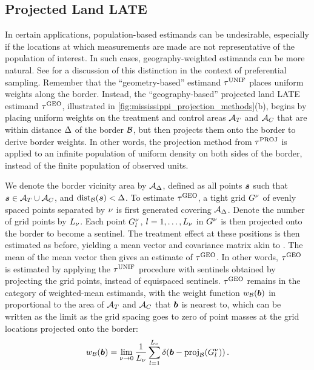 \subsection{Projected Land LATE}
In certain applications, population-based estimands can be undesirable, especially if the locations at which measurements are made are not representative of the population of interest.
In such cases, geography-weighted estimands can be more natural.
See \cite{antonelli2016positive} for a discussion of this distinction in the context of preferential sampling.
Remember that the ``geometry-based'' estimand \(\tau^{\mathrm{UNIF}}\) places uniform weights along the border.
Instead, the ``geography-based'' projected land LATE estimand \(\tau^{\mathrm{GEO}}\), illustrated in \autoref{fig:mississippi_projection_methods}(b), begins by placing uniform weights on the treatment and control areas \(\mathcal{A}_T\) and \(\mathcal{A}_C\) that are within distance \(\Delta\) of the border \(\mathcal{B}\), but then projects them onto the border to derive border weights.
In other words, the projection method from \(\tau^{\mathrm{PROJ}}\) is applied to an infinite population of uniform density on both sides of the border, instead of the finite population of observed units.

	We denote the border vicinity area by \(\mathcal{A}_\Delta\), defined as all points \(\bm{s}\) such that \(\bm{s} \in {\mathcal{A}_T\cup \mathcal{A}_C}\), and \(\dist_{\border}\del{\svec} < \buffer\).
To estimate \(\tau^{\mathrm{GEO}}\), a tight grid \(G^\nu\) of evenly spaced points separated by \(\nu\) is first generated covering \(\mathcal{A}_\Delta\).
Denote the number of grid points by \(L_\nu\).
Each point \(G^\nu_l\), \(l=1,\dotsc,L_\nu\) in \(G^\nu\) is then projected onto the border to become a sentinel.
The treatment effect at these positions is then estimated as before, yielding a mean vector and covariance matrix akin to .
The mean of the mean vector then gives an estimate of \(\tau^{\mathrm{GEO}}\).
In other words, \(\tau^{\mathrm{GEO}}\) is estimated by applying the \(\tau^{\mathrm{UNIF}}\) procedure with sentinels obtained by projecting the grid points, instead of equispaced sentinels.
\(\tau^{\mathrm{GEO}}\) remains in the category of weighted-mean estimands, with the weight function \(w_{\mathcal{B}}(\bm{b})\) in  proportional to the area of \(\mathcal{A}{}_{T}\) and \(\mathcal{A}{}_{C}\) that \(\bm{b}\) is nearest to, which can be written as the limit as the grid spacing goes to zero of point masses at the grid locations projected onto the border:
\begin{equation}
    \weightb(\sentinel) = \lim_{\gridres \rightarrow 0}\frac{1}{L_\gridres}\sum_{l=1}^{L_\gridres} \delta\del{\sentinel - \proj_{\border}\del{\grid_l} }\,.
\end{equation}

